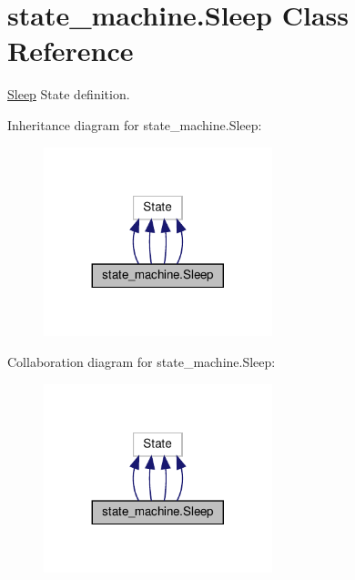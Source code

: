 \hypertarget{classstate__machine_1_1Sleep}{}\section{state\+\_\+machine.\+Sleep Class Reference}
\label{classstate__machine_1_1Sleep}


\hyperlink{classstate__machine_1_1Sleep}{Sleep} State definition.  




Inheritance diagram for state\+\_\+machine.\+Sleep\+:
\nopagebreak
\begin{figure}[H]
\begin{center}
\leavevmode
\includegraphics[width=188pt]{classstate__machine_1_1Sleep__inherit__graph}
\end{center}
\end{figure}


Collaboration diagram for state\+\_\+machine.\+Sleep\+:
\nopagebreak
\begin{figure}[H]
\begin{center}
\leavevmode
\includegraphics[width=188pt]{classstate__machine_1_1Sleep__coll__graph}
\end{center}
\end{figure}
